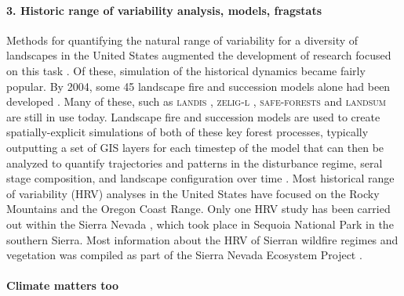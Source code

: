\documentclass[12pt]{article}
\begin{document}
\begin{spacing}{1}
\paragraph{3. Historic range of variability analysis, models, fragstats}
Methods for quantifying the natural range of variability for a diversity of landscapes in the United States augmented the development of research focused on this task \citep{Landres1999}. Of these, simulation of the historical dynamics became fairly popular. By 2004, some 45 landscape fire and succession models alone had been developed \citep{Keane2004}. Many of these, such as \textsc{landis} \citep{He1999}, \textsc{zelig-l} \citep{Miller1999}, \textsc{safe-forests} \cite{Sessions1997} and \textsc{landsum} \citep{Keane2012} are still in use today. Landscape fire and succession models are used to create spatially-explicit simulations of both of these key forest processes, typically outputting a set of GIS layers for each timestep of the model that can then be analyzed to quantify trajectories and patterns in the disturbance regime, seral stage composition, and landscape configuration over time \citep{Keane2004}. Most historical range of variability (HRV) analyses in the United States have focused on the Rocky Mountains and the Oregon Coast Range. Only one HRV study has been carried out within the Sierra Nevada \citep{Miller1999}, which took place in Sequoia National Park in the southern Sierra. Most information about the HRV of Sierran wildfire regimes and vegetation was compiled as part of the Sierra Nevada Ecosystem Project \citep{SNEP1996a}. 

\paragraph{Climate matters too}


\end{spacing}
\end{document}

